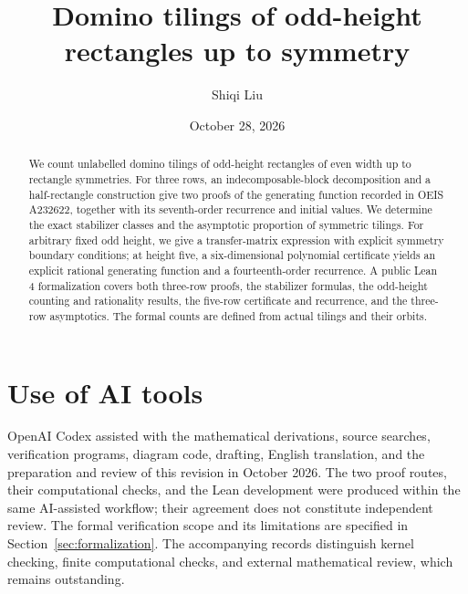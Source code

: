 \documentclass[11pt,a4paper]{amsart}
\title[Domino tilings up to symmetry]{Domino tilings of odd-height rectangles up to symmetry}
\author{Shiqi Liu}
\date{October 28, 2026}
\theoremstyle{definition}
\theoremstyle{remark}
\numberwithin{equation}{section}
\begin{document}
\begin{abstract}
We count unlabelled domino tilings of odd-height rectangles of even width up to rectangle symmetries. For three rows, an indecomposable-block decomposition and a half-rectangle construction give two proofs of the generating function recorded in OEIS A232622, together with its seventh-order recurrence and initial values. We determine the exact stabilizer classes and the asymptotic proportion of symmetric tilings. For arbitrary fixed odd height, we give a transfer-matrix expression with explicit symmetry boundary conditions; at height five, a six-dimensional polynomial certificate yields an explicit rational generating function and a fourteenth-order recurrence. A public Lean 4 formalization covers both three-row proofs, the stabilizer formulas, the odd-height counting and rationality results, the five-row certificate and recurrence, and the three-row asymptotics. The formal counts are defined from actual tilings and their orbits.
\end{abstract}
\maketitle








\appendix


\section*{Use of AI tools}
OpenAI Codex assisted with the mathematical derivations, source searches,
verification programs, diagram code, drafting, English translation,
and the preparation and review of this revision in October 2026.
The two proof routes, their computational checks, and the Lean development
were produced within the same AI-assisted workflow; their agreement does
not constitute independent review. The formal verification scope and its
limitations are specified in Section~\ref{sec:formalization}.
The accompanying records distinguish kernel checking, finite computational
checks, and external mathematical review, which remains outstanding.

\end{document}
